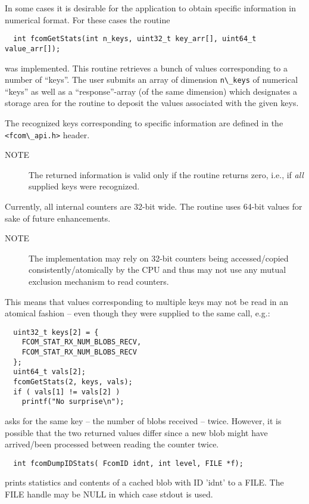 \documentclass[11pt]{article}
\newcommand{\blob}{blob}
\newcommand{\cstl}[1]{{\lstinline+#1+}}
\newcommand{\note}[1]{
	\begin{description}
		\item[NOTE] #1
	\end{description}
}
\begin{document}
      In some cases it is desirable for the application to obtain
      specific information in numerical format. For these cases
      the routine
      \begin{verbatim}
  int fcomGetStats(int n_keys, uint32_t key_arr[], uint64_t value_arr[]);
      \end{verbatim}
      was implemented. This routine retrieves a bunch of values
      corresponding to a number of ``keys''. The user submits an
      array of dimension \cstl{n\_keys} of numerical ``keys''
      as well as a ``response''-array (of the same dimension) which
      designates a storage area for the routine to deposit the
      values associated with the given keys.

      The recognized keys corresponding to specific information
      are defined in the \cstl{<fcom\_api.h>} header.
 
      \note{The returned information is valid only if the
      routine returns zero, i.e., if {\em all} supplied keys
      were recognized.}

      Currently, all internal counters are 32-bit wide. The
      routine uses 64-bit values for sake of future enhancements.

      \note{The implementation may rely on 32-bit counters
      being accessed/copied consistently/atomically by the CPU and thus
      may not use any mutual exclusion mechanism to read counters.}

      This means that values corresponding to multiple keys
      may not be read in an atomical fashion -- even though
      they were supplied to the same call, e.g.:
      \begin{verbatim}
  uint32_t keys[2] = {
    FCOM_STAT_RX_NUM_BLOBS_RECV,
    FCOM_STAT_RX_NUM_BLOBS_RECV
  };
  uint64_t vals[2];
  fcomGetStats(2, keys, vals);
  if ( vals[1] != vals[2] )
    printf("No surprise\n");
      \end{verbatim}
      asks for the same key -- the number of \blob{}s received --
      twice. However, it is possible that the two returned values
      differ since a new \blob{} might have arrived/been processed
      between reading the counter twice.

      \begin{verbatim}
  int fcomDumpIDStats( FcomID idnt, int level, FILE *f);
      \end{verbatim}

	  prints statistics and contents of a cached \blob{} with
      ID 'idnt' to a FILE. The FILE handle may be NULL in
      which case stdout is used. 
\end{document}
